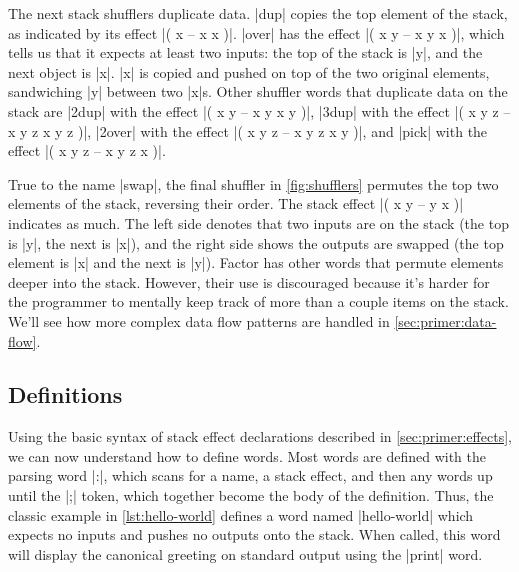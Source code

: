 The next stack shufflers duplicate data.  \factor|dup| copies the top element
of the stack, as indicated by its effect \factor|( x -- x x )|.  \factor|over|
has the effect \factor|( x y -- x y x )|, which tells us that it expects at
least two inputs: the top of the stack is \factor|y|, and the next object is
\factor|x|.  \factor|x| is copied and pushed on top of the two original
elements, sandwiching \factor|y| between two \factor|x|s.  Other shuffler words
that duplicate data on the stack are
%
\factor|2dup| with the effect \factor|( x y -- x y x y )|,
%
\factor|3dup| with the effect \factor|( x y z -- x y z x y z )|,
%
\factor|2over| with the effect \factor|( x y z -- x y z x y )|, and
%
\factor|pick| with the effect \factor|( x y z -- x y z x )|.

True to the name \factor|swap|, the final shuffler in \cref{fig:shufflers}
permutes the top two elements of the stack, reversing their order.  The stack
effect
%
\factor|( x y -- y x )|
%
indicates as much.  The left side denotes that two inputs are on the stack (the
top is \factor|y|, the next is \factor|x|), and the right side shows the
outputs are swapped (the top element is \factor|x| and the next is \factor|y|).
Factor has other words that permute elements deeper into the stack.  However,
their use is discouraged because it's harder for the programmer to mentally
keep track of more than a couple items on the stack.  We'll see how more
complex data flow patterns are handled in \cref{sec:primer:data-flow}.

\subsection{Definitions}\label{sec:primer:colon-defs}



Using the basic syntax of stack effect declarations described in
\cref{sec:primer:effects}, we can now understand how to define words.  Most
words are defined with the parsing word \factor|:|, which scans for a name, a
stack effect, and then any words up until the \factor|;| token, which together
become the body of the definition.  Thus, the classic example in
\cref{lst:hello-world} defines a word named \factor|hello-world| which expects
no inputs and pushes no outputs onto the stack.  When called, this word will
display the canonical greeting on standard output using the \factor|print|
word.



